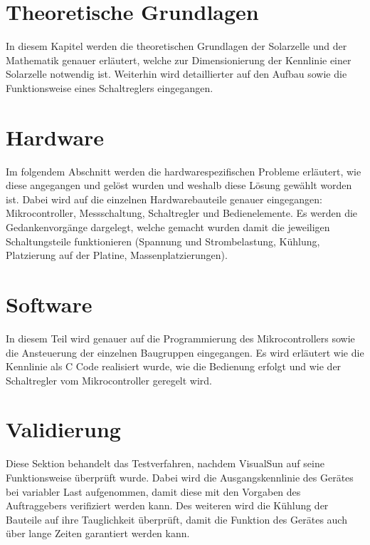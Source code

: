\documentclass[a4paper]{fhnwreport} %
\begin{document}
\section{Theoretische Grundlagen}

In diesem Kapitel werden die theoretischen Grundlagen der Solarzelle und der Mathematik genauer erläutert, welche zur Dimensionierung der Kennlinie einer Solarzelle notwendig ist. Weiterhin wird detaillierter auf den Aufbau sowie die Funktionsweise eines Schaltreglers eingegangen. 

\section{Hardware} 

Im folgendem Abschnitt werden die hardwarespezifischen Probleme erläutert, wie diese angegangen und gelöst wurden und weshalb diese Lösung gewählt worden ist. Dabei wird auf die einzelnen Hardwarebauteile genauer eingegangen: Mikrocontroller, Messschaltung, Schaltregler und Bedienelemente. Es werden die Gedankenvorgänge dargelegt, welche gemacht wurden damit die jeweiligen Schaltungsteile funktionieren (Spannung und Strombelastung, Kühlung, Platzierung auf der Platine, Massenplatzierungen).

\section{Software}

In diesem Teil wird genauer auf die Programmierung des Mikrocontrollers sowie die Ansteuerung der einzelnen Baugruppen eingegangen. Es wird erläutert wie die Kennlinie als C Code realisiert wurde, wie die Bedienung erfolgt und wie der Schaltregler vom Mikrocontroller geregelt wird. 

\section{Validierung}

Diese Sektion behandelt das Testverfahren, nachdem VisualSun auf seine Funktionsweise überprüft wurde. Dabei wird die Ausgangskennlinie des Gerätes bei variabler Last aufgenommen, damit diese mit den Vorgaben des Auftraggebers verifiziert werden kann. Des weiteren wird die Kühlung der Bauteile auf ihre Tauglichkeit überprüft, damit die Funktion des Gerätes auch über lange Zeiten garantiert werden kann. 
\end{document}
